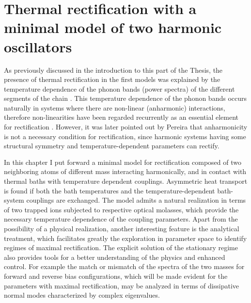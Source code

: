 
\chapter{Thermal rectification with a minimal model of two
harmonic oscillators}
\label{Chapter6}
%

As previously discussed in the introduction to this part of the Thesis, the presence of thermal rectification in the first models was explained by the temperature dependence of the phonon bands (power spectra) of the different segments of the chain \cite{Terraneo2002,Li2004}. This temperature dependence of the phonon bands occurs naturally in systems where there are non-linear (anharmonic) interactions, therefore non-linearities have been regarded recurrently as an essential element for rectification \cite{Li2012,Li2008,Hu2006,Zeng2008,Segal2005,Segal2005b,Katz2016,Benenti2016}. However, it was later pointed out by Pereira \cite{Pereira2017} that anharmonicity is not a necessary condition for rectification, since harmonic systems having some structural symmetry and temperature-dependent parameters can rectify.

In this chapter I put forward a minimal model for rectification composed of two neighboring atoms of different mass interacting harmonically, and in contact with thermal baths with temperature dependent couplings. Asymmetric heat transport is found if both the bath temperatures and the temperature-dependent bath-system couplings are exchanged. The model admits a natural realization in terms of two trapped ions subjected to respective optical molasses, which provide the necessary temperature dependence of the coupling parameters. Apart from the possibility of a physical realization, another interesting
feature is the analytical treatment, which facilitates greatly the exploration in parameter  space to  identify regimes of maximal rectification. The explicit solution of the stationary regime also provides tools for a better understanding of the physics and enhanced control. For example the match or mismatch of the spectra of the two masses for forward and reverse bias configurations, which will be made evident for the parameters with maximal
rectification, may be analyzed in terms of dissipative normal modes characterized by complex eigenvalues.

